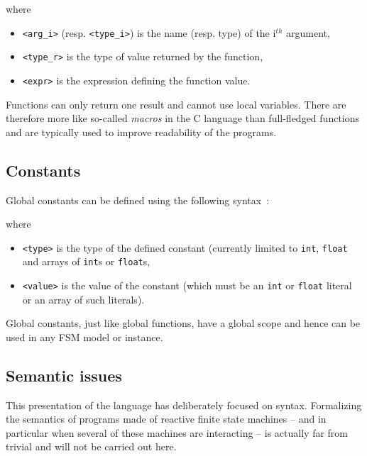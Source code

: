 \noindent
where
\begin{itemize}
\item \lstinline[language=Rfsm]|<arg_i>| (resp. \lstinline[language=Rfsm]|<type_i>|) is the name
  (resp. type) of the i$^{th}$ argument,
\item \lstinline[language=Rfsm]|<type_r>| is the type of value returned by the function,
\item \lstinline[language=Rfsm]|<expr>| is the expression defining the function value.
\end{itemize}

\medskip
\step Functions can only return one result and cannot use local variables. There are therefore more
like so-called \emph{macros} in the C language than full-fledged functions and are typically used to
improve readability of the programs.

\clearpage
\subsection{Constants}
\label{sec:constants}

Global constants can be defined using the following syntax~:  

\begin{center}
\end{center}

\noindent
where
\begin{itemize}
\item \lstinline[language=Rfsm]|<type>| is the type of the defined constant (currently limited to
  \verb|int|, \verb|float| and arrays of \verb|int|s or \verb|float|s,
\item \lstinline[language=Rfsm]|<value>| is the value of the constant (which must be an \verb|int|
  or \verb|float| literal or an array of such literals).
\end{itemize}

Global constants, just like global functions, have a global scope and hence can be used in any FSM
model or instance.

\subsection{Semantic issues}
\label{sec:semantic-issues}

This presentation of the language has deliberately focused on syntax. Formalizing the semantics of programs made of
reactive finite state machines -- and in particular when several of these machines are interacting
-- is actually far from trivial and will not be carried out here. 

